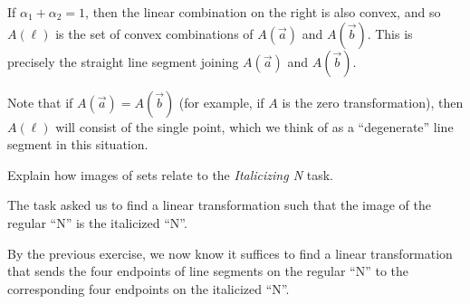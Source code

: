 \documentclass{problemset}
\begin{document}
\begin{parts}
\begin{solution}
				If $\alpha_1+\alpha_2=1$, then the linear combination on the right
				is also convex, and so $A(\ell)$ is the set of convex combinations
				of $A(\vec a)$ and $A(\vec b)$.
				This is precisely the straight line segment joining $A(\vec a)$
				and $A(\vec b)$.

				Note that if $A(\vec a)=A(\vec b)$ (for example, if $A$ is the
				zero transformation), then $A(\ell)$ will consist of the single
				point, which we think of as a ``degenerate'' line segment in this
				situation.
			\end{solution}
		\item Explain how images of sets relate to the \emph{Italicizing N} task.
			\begin{solution}
				The task asked us to find a linear transformation such that the
				image of the regular ``N'' is the italicized ``N''.

				By the previous exercise, we now know it suffices to find a
				linear transformation that sends the four endpoints of line
				segments on the regular ``N'' to the corresponding four endpoints
				on the italicized ``N''.
			\end{solution}
	\end{parts}
\end{document}
